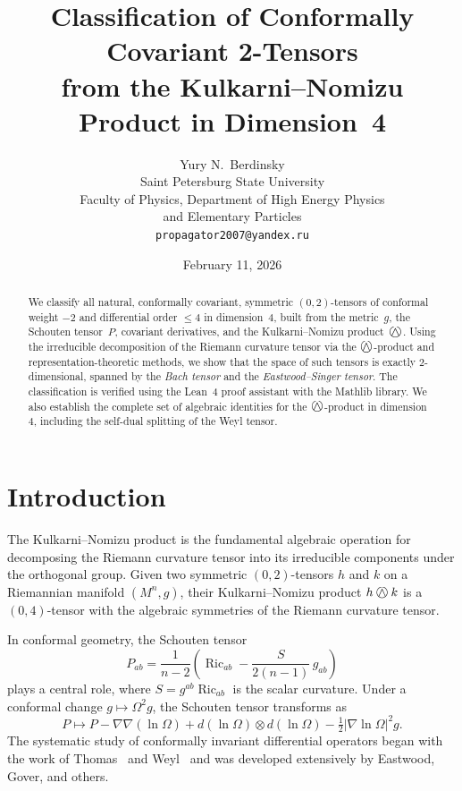 \documentclass[11pt,a4paper]{article}
\title{Classification of Conformally Covariant 2-Tensors\\
from the Kulkarni--Nomizu Product in Dimension~4}
\author{Yury N.\ Berdinsky\\[4pt]
\small Saint Petersburg State University\\
\small Faculty of Physics, Department of High Energy Physics\\
\small and Elementary Particles\\[2pt]
\small \texttt{propagator2007@yandex.ru}}
\date{February 11, 2026}
\newcommand{\owedge}{\mathbin{%
  \text{%
    \ooalign{%
      \hfil$\wedge$\hfil\cr
      \hfil\raisebox{0.05em}{$\bigcirc$}\hfil\cr
    }%
  }%
}}
\begin{document}
\maketitle

\begin{abstract}
We classify all natural, conformally covariant, symmetric
$(0,2)$-tensors of conformal weight $-2$ and differential order $\le 4$
in dimension~$4$, built from the metric~$g$, the Schouten tensor~$P$,
covariant derivatives, and the Kulkarni--Nomizu product~$\owedge$.
Using the irreducible decomposition of the Riemann curvature tensor
via the $\owedge$-product and representation-theoretic methods, we show
that the space of such tensors is exactly $2$-dimensional, spanned by the
\emph{Bach tensor} and the \emph{Eastwood--Singer tensor}.
The classification is verified using the Lean~4 proof assistant with the
Mathlib library. We also establish the complete set of algebraic identities
for the $\owedge$-product in dimension~$4$, including the self-dual splitting
of the Weyl tensor.
\end{abstract}

\tableofcontents

\section{Introduction}

The Kulkarni--Nomizu product is the fundamental algebraic operation for
decomposing the Riemann curvature tensor into its irreducible components
under the orthogonal group. Given two symmetric $(0,2)$-tensors $h$ and $k$
on a Riemannian manifold $(M^n, g)$, their Kulkarni--Nomizu product
$h \owedge k$ is a $(0,4)$-tensor with the algebraic symmetries of the
Riemann curvature tensor.

In conformal geometry, the Schouten tensor
\[
  P_{ab} = \frac{1}{n-2}\left(\operatorname{Ric}_{ab}
    - \frac{S}{2(n-1)}\,g_{ab}\right)
\]
plays a central role, where $S = g^{ab}\operatorname{Ric}_{ab}$ is the
scalar curvature. Under a conformal change $g \mapsto \Omega^2 g$,
the Schouten tensor transforms as
\[
  P \mapsto P - \nabla\nabla(\ln\Omega) + d(\ln\Omega)\otimes d(\ln\Omega)
    - \tfrac12 |\nabla\ln\Omega|^2 g.
\]
The systematic study of conformally invariant differential operators
began with the work of Thomas~\cite{thomas1926} and Weyl~\cite{weyl1918}
and was developed extensively by Eastwood, Gover, and others.
\end{document}
